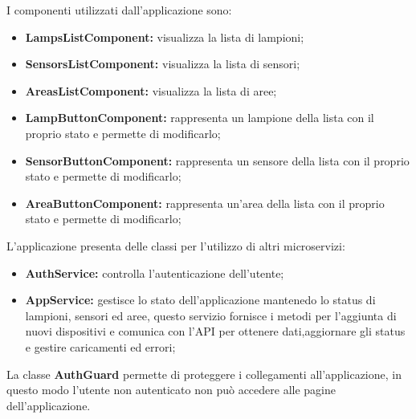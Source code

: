 I componenti utilizzati dall'applicazione sono:
\begin{itemize}
    \item \textbf{LampsListComponent:} visualizza la lista di lampioni;
    \item \textbf{SensorsListComponent:} visualizza la lista di sensori;
    \item \textbf{AreasListComponent:} visualizza la lista di aree;
    \item \textbf{LampButtonComponent:} rappresenta un lampione della lista con il proprio stato e permette di modificarlo;
    \item \textbf{SensorButtonComponent:} rappresenta un sensore della lista con il proprio stato e permette di modificarlo;
    \item \textbf{AreaButtonComponent:} rappresenta un'area della lista con il proprio stato e permette di modificarlo;
\end{itemize}

L'applicazione presenta delle classi per l'utilizzo di altri microservizi:
\begin{itemize}
    \item \textbf{AuthService:} controlla l'autenticazione dell'utente;
    \item \textbf{AppService:} gestisce lo stato dell'applicazione mantenedo lo status di lampioni, sensori ed aree, questo servizio fornisce i metodi per l'aggiunta di nuovi dispositivi e comunica con l'API per ottenere dati,aggiornare gli status e gestire caricamenti ed errori;
\end{itemize}

La classe \textbf{AuthGuard} permette di proteggere i collegamenti all'applicazione, in questo modo l'utente non autenticato non può accedere alle pagine dell'applicazione.